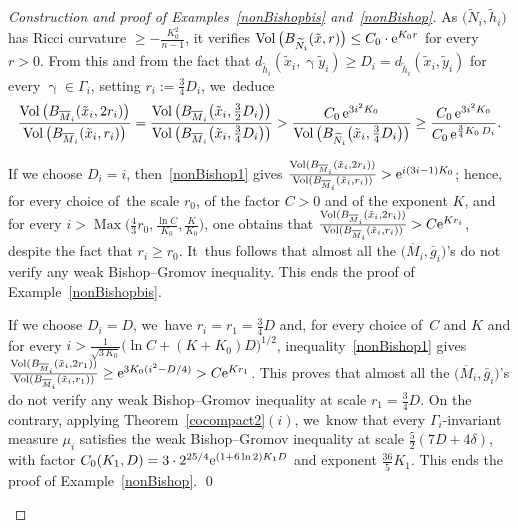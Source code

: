 \documentclass[pdftex]{sigma}
\numberwithin{equation}{section}
\newcommand{\Vol}{\operatorname{Vol}}
\newcommand{\Max}{\operatorname{Max}}
\newcommand{\g}{\operatorname{\gamma}}
\begin{document}
\begin{proof}[Construction and proof of Examples~\ref{nonBishopbis} and~\ref{nonBishop}]
As $\big(\widetilde N_i, \tilde h_i\big)$ has Ricci curvature $ \ge - \frac{K_0^2}{n-1}$, it verifies $\Vol \big( B_{\widetilde N_i} (\tilde x,r)\big) \le C_0\cdot {\rm e}^{K_0 r}$ for every
$r > 0$. From this and from the fact that $d_{\tilde h_i} (\tilde x_i, \g \tilde y_i) \ge D_i = d_{\tilde h_i} (\tilde x_i, \tilde y_i)$ for every $\g \in \Gamma_i$, setting $r_i := \frac{3}{4} D_i $, we~deduce
\begin{gather}\label{nonBishop1}
\dfrac{\Vol\big(B_{\overline M_i}(\tilde x_i,2 r_i)\big)}{\Vol \big(B_{\overline M_i}(\tilde x_i,r_i)\big)} = \dfrac{\Vol \big(B_{\overline M_i} \big(\tilde x_i,\frac{3}{2} D_i\big)\big)} {\Vol\big(B_{\overline M_i} \big(\tilde x_i,\frac{3}{4} D_i\big)\big)}
> \dfrac{C_0 \,{\rm e}^{3i^2 K_0}}{\Vol \big(B_{\widetilde N_i} \big(\tilde x_i,\frac{3}{4} D_i\big) \big)} \ge \dfrac{C_0 \,{\rm e}^{3 i^2 K_0}}{C_0 \,{\rm e}^{\frac{3}{4} K_0 \, D_i }}.
\end{gather}

\begin{itemize}\itemsep=0pt
{\sloppy\item
If we choose $D_i =i$, then~\eqref{nonBishop1} gives $\frac{\Vol
(B_{\overline M_i} (\tilde x_i,2 r_i))}{\Vol (B_{\overline M_i}
(\tilde x_i, r_i))} > {\rm e}^{i (3 i-1) K_0}$; hence, for every choice of~the scale $r_0$, of the factor $C> 0$ and of the exponent $K$, and for every
$i > \Max \big(\frac{4}{3} r_0, \frac{\ln C}{K_0}, \frac{K}{K_0}\big)$, one obtains
that $\frac{\Vol ( B_{\overline M_i} (\tilde x_i,2 r_i))}{\Vol (B_{\overline M_i} (\tilde x_i, r_i))} > C {\rm e}^{K r_i}$, despite the fact that $r_i \ge r_0$. It~thus follows that almost all the $\big(\overline M_i, \bar g_i\big)$'s do not verify any weak Bishop--Gromov inequality.
This ends the proof of Example~\ref{nonBishopbis}.

}

\item
If we choose $D_i = D$, we~have $r_i = r_1 = \frac{3}{4} D$ and, for every choice of~$C$ and $K$ and for every
$i > \frac{1}{\sqrt{3 \,K_0}}\big(\ln C + (K + K_0) D \big)^{1/2}$, inequality~\eqref{nonBishop1} gives
$\frac{\Vol(B_{\overline M_i} (\tilde x_i,2 r_1))}{\Vol(B_{\overline M_i} (\tilde x_i, r_1))} \ge {\rm e}^{3 K_0 (i^2 - D/4)} > C{\rm e}^{K r_1}$.
This proves that almost all the $\big(\overline M_i, \bar g_i\big)$'s do not verify any weak Bishop--Gromov inequality at scale $ r_1 =\frac{3}{4} D$.
On the contrary, applying Theorem~\ref{cocompact2}$(i)$, we~know that every $\Gamma_i$-invariant measure $\mu_i$ satisfies the
weak Bishop--Gromov inequality at scale \mbox{$\frac{5}{2} (7 D + 4 \delta)$}, with factor $ C_0 (K_1, D) = 3\cdot 2^{25/4} {\rm e}^{(1+ 6 \ln 2) K_1 D}$ and
exponent $\frac{36}{5} K_1$. This ends the proof of Example~\ref{nonBishop}.
\hfill \qed
\end{itemize}\renewcommand{\qed}{}
\end{proof}
\end{document}
